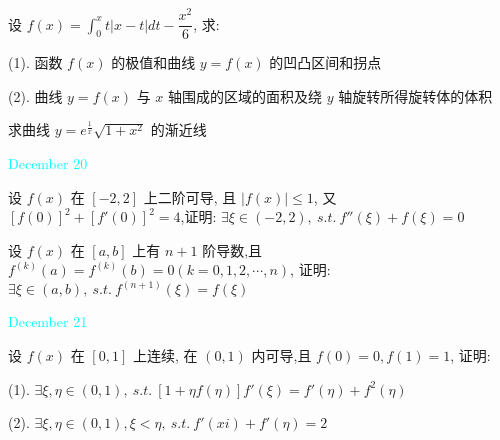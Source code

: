 \begin{example}[][Exam: 38.3.9]
	设 $f(x)=\int_{0}^{x}t|x-t|dt-\dfrac{x^{2}}{6}$, 求:

(1). 函数 $f(x)$ 的极值和曲线 $y=f(x)$ 的凹凸区间和拐点

(2). 曲线 $y=f(x)$ 与 $x$ 轴围成的区域的面积及绕 $y$ 轴旋转所得旋转体的体积
\end{example}

\begin{solution}
	
\end{solution}

\begin{example}[][Exam: 38.3.10]
	求曲线 $y=e^{\frac{1}{x}}\sqrt{1+x^{2}}$ 的渐近线
\end{example}

\begin{solution}
	
\end{solution}


\textcolor{cyan}{December 20}

\begin{example}[][Exam: 38.3.11]
	设 $f(x)$ 在 $[-2,2]$ 上二阶可导, 且 $|f(x)|\leq 1$, 又 $[f(0)]^{2}+[f'(0)]^{2}=4$,证明: 
	$\exists \xi \in (-2,2), \ s.t.\ f''(\xi)+f(\xi)=0$
\end{example}

\begin{solution}
	
\end{solution}

\begin{example}[][Exam: 38.3.12]
	设 $f(x)$ 在 $[a,b]$ 上有 $n+1$ 阶导数,且 $f^{(k)}(a)=f^{(k)}(b)=0 (k=0,1,2,\cdots,n)$, 证明: $\exists \xi\in(a,b),\ s.t.\ f^{(n+1)}(\xi)=f(\xi)$
\end{example}

\begin{solution}
	
\end{solution}


\textcolor{cyan}{December 21}

\begin{example}[][Exam: 38.3.13]
	设 $f(x)$ 在 $[0,1]$ 上连续, 在 $(0,1)$ 内可导,且 $f(0)=0,f(1)=1$, 证明:

(1). $\exists \xi,\eta\in(0,1),\ s.t.\ [1+\eta f(\eta)] f'(\xi)= f'(\eta)+f^{2}(\eta)$

(2). $\exists \xi,\eta\in(0,1),\xi < \eta,\ s.t.\ f'(xi)+f'(\eta)=2$
\end{example}

